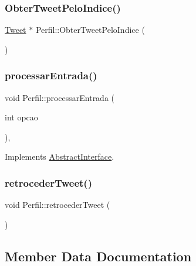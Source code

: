 \subsubsection{\texorpdfstring{Obter\+Tweet\+Pelo\+Indice()}{ObterTweetPeloIndice()}}
{\footnotesize\ttfamily \hyperlink{class_tweet}{Tweet} $\ast$ Perfil\+::\+Obter\+Tweet\+Pelo\+Indice (\begin{DoxyParamCaption}{ }\end{DoxyParamCaption})\hspace{0.3cm}{\ttfamily [private]}}

\mbox{\label{class_perfil_ad6a7cb27685c99b2660851819dc69b8f}} 
\subsubsection{\texorpdfstring{processar\+Entrada()}{processarEntrada()}}
{\footnotesize\ttfamily void Perfil\+::processar\+Entrada (\begin{DoxyParamCaption}\item[{int}]{opcao }\end{DoxyParamCaption})\hspace{0.3cm}{\ttfamily [override]}, {\ttfamily [virtual]}}



Implements \hyperlink{class_abstract_interface_acf8223a1da27c6986158836a57fa51ee}{Abstract\+Interface}.

\mbox{\label{class_perfil_a4773ccaa4dee6f040e893935ea2073e9}} 
\subsubsection{\texorpdfstring{retroceder\+Tweet()}{retrocederTweet()}}
{\footnotesize\ttfamily void Perfil\+::retroceder\+Tweet (\begin{DoxyParamCaption}{ }\end{DoxyParamCaption})\hspace{0.3cm}{\ttfamily [private]}}



\subsection{Member Data Documentation}
\mbox{\label{class_perfil_a532aa01a2dddba12cc73cc79942e3d4f}} 
